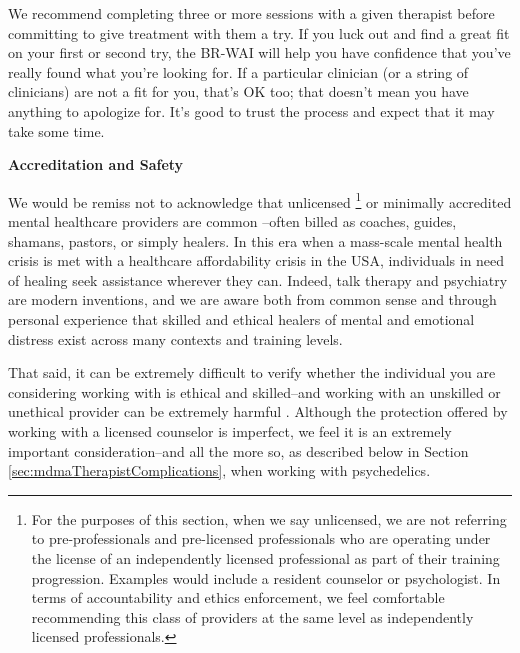 \documentclass[12pt,letterpaper]{book}
\begin{document}
We recommend completing three or more sessions with a given therapist before committing to give treatment with them a try. If you luck out and find a great fit on your first or second try, the BR-WAI will help you have confidence that you've really found what you're looking for. If a particular clinician (or a string of clinicians) are not a fit for you, that's OK too; that doesn't mean you have anything to apologize for.  It's good to trust the process and expect that it may take some time.

\noindent \textbf{Accreditation and Safety}
\label{sec:accreditation}

We would be remiss not to acknowledge that unlicensed \footnote{For the purposes of this section, when we say unlicensed, we are not referring to pre-professionals and pre-licensed professionals who are operating under the license of an independently licensed professional as part of their training progression. Examples would include a resident counselor or psychologist. In terms of accountability and ethics enforcement, we feel comfortable recommending this class of providers at the same level as independently licensed professionals.} or minimally accredited mental healthcare providers are common \cite{aboujaoude2020coachingVSTherapy} --often billed as coaches, guides, shamans, pastors, or simply healers. In this era when a mass-scale mental health crisis is met with a healthcare affordability crisis in the USA, individuals in need of healing seek assistance wherever they can. Indeed, talk therapy and psychiatry are modern inventions, and we are aware both from common sense and through personal experience that skilled and ethical healers of mental and emotional distress exist across many contexts and training levels. 

That said, it can be extremely difficult to verify whether the individual you are considering working with is ethical and skilled--and working with an unskilled or unethical provider can be extremely harmful \cite{hook2018boundary,therapisttocoach}. Although the protection offered by working with a licensed counselor is imperfect, we feel it is an extremely important consideration--and all the more so, as described below in Section \ref{sec:mdmaTherapistComplications}, when working with psychedelics. 
\end{document}
